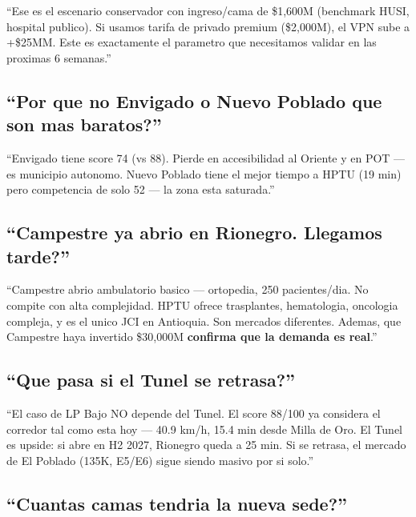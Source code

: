 \documentclass[11pt, a4paper]{article}
\begin{document}
\begin{tip}
``Ese es el escenario conservador con ingreso/cama de \$1,600M (benchmark HUSI, hospital publico). Si usamos tarifa de privado premium (\$2,000M), el VPN sube a +\$25MM. Este es exactamente el parametro que necesitamos validar en las proximas 6 semanas.''
\end{tip}

\subsection{``Por que no Envigado o Nuevo Poblado que son mas baratos?''}

\begin{tip}
``Envigado tiene score 74 (vs 88). Pierde en accesibilidad al Oriente y en POT --- es municipio autonomo. Nuevo Poblado tiene el mejor tiempo a HPTU (19 min) pero competencia de solo 52 --- la zona esta saturada.''
\end{tip}

\subsection{``Campestre ya abrio en Rionegro. Llegamos tarde?''}

\begin{tip}
``Campestre abrio ambulatorio basico --- ortopedia, 250 pacientes/dia. No compite con alta complejidad. HPTU ofrece trasplantes, hematologia, oncologia compleja, y es el unico JCI en Antioquia. Son mercados diferentes. Ademas, que Campestre haya invertido \$30,000M \textbf{confirma que la demanda es real}.''
\end{tip}

\subsection{``Que pasa si el Tunel se retrasa?''}

\begin{tip}
``El caso de LP Bajo NO depende del Tunel. El score 88/100 ya considera el corredor tal como esta hoy --- 40.9 km/h, 15.4 min desde Milla de Oro. El Tunel es upside: si abre en H2 2027, Rionegro queda a 25 min. Si se retrasa, el mercado de El Poblado (135K, E5/E6) sigue siendo masivo por si solo.''
\end{tip}

\subsection{``Cuantas camas tendria la nueva sede?''}
\end{document}
